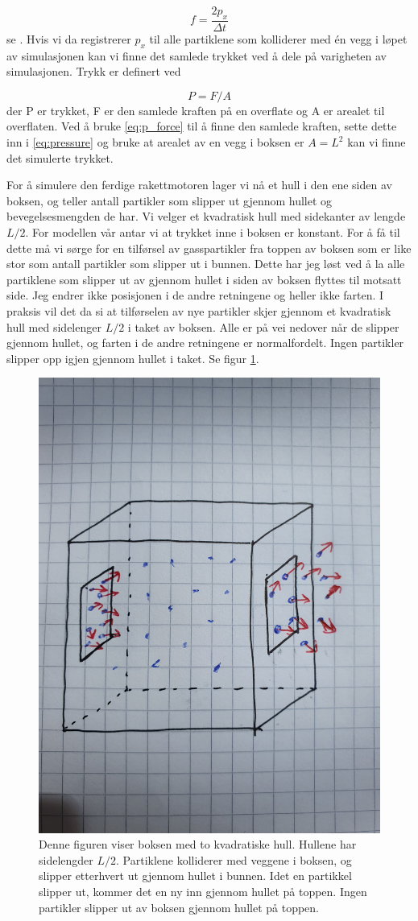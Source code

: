 \documentclass[reprint,english,notitlepage]{revtex4-1}  %
\begin{document}
\begin{equation}
  \label{eq:p_force}
  f = \frac{2 p_x}{\Delta t}
\end{equation}
 se \citep{part1A}. Hvis vi da registrerer $p_x$ til alle partiklene som kolliderer med én vegg i løpet av simulasjonen kan vi finne det samlede trykket ved å dele på varigheten av simulasjonen. Trykk er definert ved

 \begin{equation}
   \label{eq:pressure}
   P = F/A
 \end{equation}
 der P er trykket, F er den samlede kraften på en overflate og A er arealet til overflaten. Ved å bruke \ref{eq:p_force} til å finne den samlede kraften, sette dette inn i \ref{eq:pressure} og bruke at arealet av en vegg i boksen er $A = L^2$ kan vi finne det simulerte trykket.

For å simulere den ferdige rakettmotoren lager vi nå et hull i den ene siden av boksen, og
 teller antall partikler som slipper ut gjennom hullet og bevegelsesmengden de har. Vi velger et kvadratisk hull med sidekanter av lengde $L/2$. For modellen vår antar vi at trykket inne i boksen er konstant. For å få til dette må vi sørge for en tilførsel av gasspartikler fra toppen av boksen som er like stor som antall partikler som slipper ut i bunnen. Dette har jeg løst ved å la alle partiklene som slipper ut av gjennom hullet i siden av boksen flyttes til motsatt side. Jeg endrer ikke posisjonen i de andre retningene og heller ikke farten. I praksis vil det da si at tilførselen av nye partikler skjer gjennom et kvadratisk hull med sidelenger $L/2$ i taket av boksen. Alle er på vei nedover når de slipper gjennom hullet, og farten i de andre retningene er normalfordelt. Ingen partikler slipper opp igjen gjennom hullet i taket. Se figur \ref{fig:boks_hull}.

\begin{figure}[htbp]
\includegraphics[angle=180, origin=c, width=0.5\linewidth]{boks_hull.jpg}
\caption{Denne figuren viser boksen med to kvadratiske hull. Hullene har sidelengder $L/2$. Partiklene kolliderer med veggene i boksen, og slipper etterhvert ut gjennom hullet i bunnen. Idet en partikkel slipper ut, kommer det en ny inn gjennom hullet på toppen. Ingen partikler slipper ut av boksen gjennom hullet på toppen. \label{fig:boks_hull}}
\end{figure}
\end{document}

